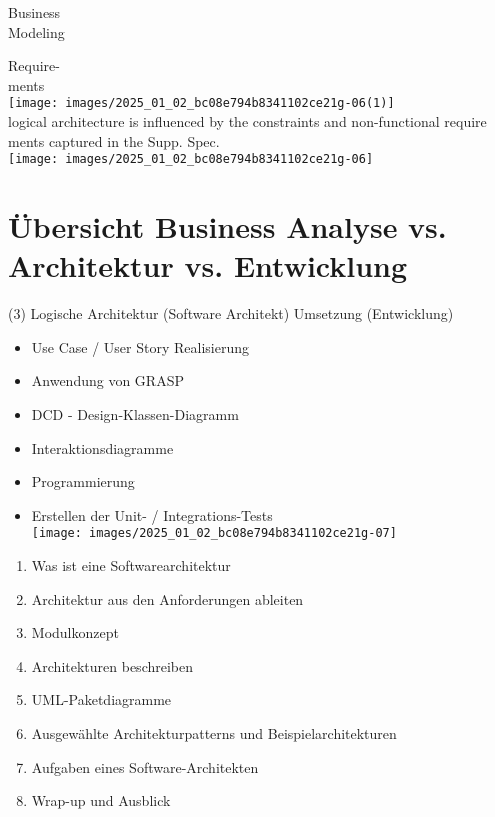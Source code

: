 \documentclass[10pt]{article}
\begin{document}
Business\\
Modeling

Require-\\
ments\\
\texttt{[image: images/2025\_01\_02\_bc08e794b8341102ce21g-06(1)]}\\
logical architecture is influenced by the constraints and non-functional require ments captured in the Supp. Spec.\\
\texttt{[image: images/2025\_01\_02\_bc08e794b8341102ce21g-06]}

\section*{Übersicht Business Analyse vs. Architektur vs. Entwicklung}
(3) Logische Architektur (Software Architekt) Umsetzung (Entwicklung)

\begin{itemize}
  \item Use Case / User Story Realisierung
  \item Anwendung von GRASP
  \item DCD - Design-Klassen-Diagramm
  \item Interaktionsdiagramme
  \item Programmierung
  \item Erstellen der Unit- / Integrations-Tests\\
\texttt{[image: images/2025\_01\_02\_bc08e794b8341102ce21g-07]}
\end{itemize}

\begin{enumerate}
  \item Was ist eine Softwarearchitektur
  \item Architektur aus den Anforderungen ableiten
  \item Modulkonzept
  \item Architekturen beschreiben
  \item UML-Paketdiagramme
  \item Ausgewählte Architekturpatterns und Beispielarchitekturen
  \item Aufgaben eines Software-Architekten
  \item Wrap-up und Ausblick
\end{enumerate}
\end{document}
